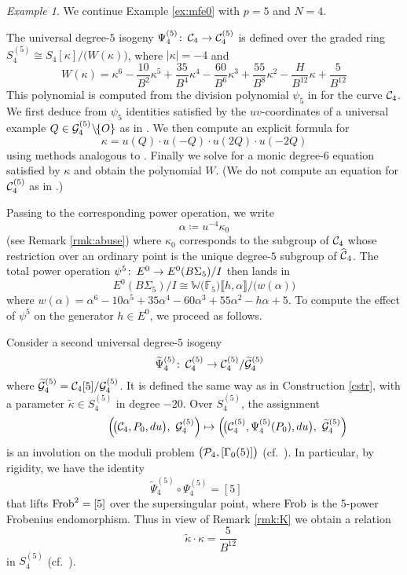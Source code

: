 \documentclass{gtpart}
\theoremstyle{definition}
\theoremstyle{remark}
\newtheorem{ex}[equation]{Example}
\def\co{\colon\thinspace}
\newcommand{\mb}[1]{\mathbb{#1}}
\newcommand{\cF}{\overline {\mb F}}
\newcommand{\CC}{{\cal C}}
\newcommand{\CG}{{\cal G}}
\newcommand{\CP}{{\cal P}}
\newcommand{\Frob}{{\rm Frob}}
\newcommand{\BW}{{\mb W}}
\newcommand{\HCC}{\widehat{~\!\!\CC}}
\newcommand{\A}{\alpha}
\newcommand{\G}{\Gamma}
\newcommand{\K}{\kappa}
\newcommand{\ce}{\coloneqq}
\newcommand{\lb}{\llbracket}
\newcommand{\rb}{\rrbracket}
\renewcommand{\=}{\approx}
\renewcommand{\-}{\sim}
\numberwithin{equation}{section}
\begin{document}
\begin{ex}
 \label{ex:po}
 We continue Example \ref{ex:mfe0} with $p = 5$ and $N = 4$.  

 The universal degree-$5$ isogeny $\Psi_4^{(5)} \co \CC_4 \to \CC_4^{(5)}$ is 
 defined over the graded ring $S_4^{(5)} \cong S_4[\K] / \big(W(\K)\big)$, where 
 $|\K| = -4$ and 
 \begin{equation}
  \label{W}
  W(\K) = \K^6 - \frac{10}{B^2} \K^5 + \frac{35}{B^4} \K^4 - \frac{60}{B^6} \K^3 
  + \frac{55}{B^8} \K^2 - \frac{H}{B^{12}} \K + \frac{5}{B^{12}} 
 \end{equation}
 This polynomial is computed from the division polynomial $\psi_5$ in 
 \cite[Exercise 3.7]{AEC} for the curve $\CC_4$.  We first deduce from $\psi_5$ 
 identities satisfied by the $uv$-coordinates of a universal example 
 $Q \in \CG_4^{(5)} \!\setminus\!\! \{O\}$ as in 
 \cite[proof of Proposition 2.2]{p3}.  We then compute an explicit formula for 
 \[
  \K = u(Q) \cdot u(-Q) \cdot u(2 Q) \cdot u(-2 Q) 
 \]
 using methods analogous to \cite[III.2.3]{AEC}.  Finally we solve for a monic 
 degree-6 equation satisfied by $\K$ and obtain the polynomial $W$.  (We do not 
 compute an equation for $\CC_4^{(5)}$ as in \cite[Proposition 2.3]{p3}.)  

 Passing to the corresponding power operation, we write 
 \begin{equation}
  \label{A}
  \A \ce u^{-4} \K_0 
 \end{equation}
 (see Remark \ref{rmk:abuse}) where $\K_0$ corresponds to the subgroup of 
 $\CC_4$ whose restriction over an ordinary point is the unique degree-$5$ 
 subgroup of $\HCC_4$.  The total power operation 
 $\psi^5 \co E^0 \to E^0(B\Sigma_5) / I$ then lands in 
 \[
  E^0(B\Sigma_5) / I \cong \BW \big( \cF_5 \big) \lb h, \A \rb / \big(w(\A)\big) 
 \]
 where $w(\A) = \A^6 - 10 \A^5 + 35 \A^4 - 60 \A^3 + 55 \A^2 - h \A + 5$.  To 
 compute the effect of $\psi^5$ on the generator $h \in E^0$, we proceed as 
 follows.  

 Consider a second universal degree-$5$ isogeny 
 \[
  \quad \widetilde{\Psi}_4^{(5)} \co \CC_4^{(5)} \to 
  \CC_4^{(5)} / \widetilde{\CG}_4^{(5)} 
 \]
 where $\widetilde{\CG}_4^{(5)} = \CC_4[5] / \CG_4^{(5)}$.  It is defined the 
 same way as in Construction \ref{cstr}, with a parameter 
 $\widetilde{\K} \in S_4^{(5)}$ in degree $-20$.  Over $S_4^{(5)}$, the 
 assignment 
 \[
  \qquad\qquad~ \left(\! \big( \CC_4, P_0, du \big), ~ \CG_4^{(5)} \right) 
  \mapsto \left(\! \big( \CC_4^{(5)}, \Psi_4^{(5)}(P_0), du \big), 
  ~ \widetilde{\CG}_4^{(5)} \right) 
 \]
 is an involution on the moduli problem $\big(\CP_4,[\G_0(5)]\big)$ 
 (cf.~\cite[11.3.1]{KM}).  In particular, by rigidity, we have the identity 
 \[
  \widetilde{\Psi}_4^{(5)} \circ \Psi_4^{(5)} = [5] \quad~~ 
 \]
 that lifts $\Frob^2 = [5]$ over the supersingular point, where $\Frob$ is the 
 5-power Frobenius endomorphism.  Thus in view of Remark \ref{rmk:K} we obtain a 
 relation 
 \[
  \quad~ \widetilde{\K} \cdot \K = \frac{5}{B^{12}} 
 \]
 in $S_4^{(5)}$ (cf.~\cite[proof of Corollary 3.2]{p3}).  


\end{ex}
\end{document}
